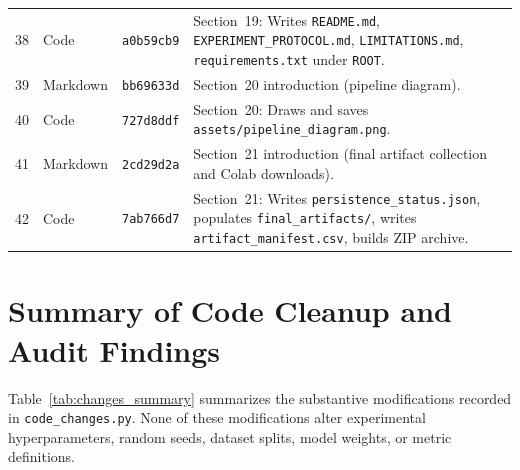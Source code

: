 \documentclass[11pt,a4paper]{article}
\begin{document}
{\begin{longtable}{r l l P{0.64\textwidth}}
38 & Code & \texttt{a0b59cb9} & Section~19: Writes \texttt{README.md}, \texttt{EXPERIMENT\_\allowbreak{}PROTOCOL.md}, \texttt{LIMITATIONS.md}, \texttt{requirements.txt} under \texttt{ROOT}. \\
39 & Markdown & \texttt{bb69633d} & Section~20 introduction (pipeline diagram). \\
40 & Code & \texttt{727d8ddf} & Section~20: Draws and saves \texttt{assets/\allowbreak{}pipeline\_\allowbreak{}diagram.png}. \\
41 & Markdown & \texttt{2cd29d2a} & Section~21 introduction (final artifact collection and Colab downloads). \\
42 & Code & \texttt{7ab766d7} & Section~21: Writes \texttt{persistence\_\allowbreak{}status.json}, populates \texttt{final\_\allowbreak{}artifacts/\allowbreak{}}, writes \texttt{artifact\_\allowbreak{}manifest.csv}, builds ZIP archive. \\
\end{longtable}}

\section{Summary of Code Cleanup and Audit Findings}
\label{app:changes}

Table~\ref{tab:changes_summary} summarizes the substantive modifications recorded in \texttt{code\_\allowbreak{}changes.py}. None of these modifications alter experimental hyperparameters, random seeds, dataset splits, model weights, or metric definitions.
\end{document}

